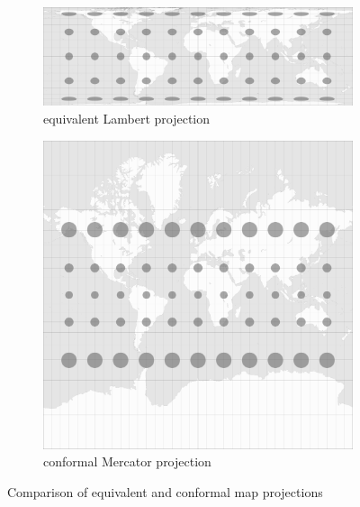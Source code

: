 \begin{figure}[ht]
  \centering
  \begin{subfigure}{0.59\textwidth}
    \centering
    \includegraphics[width=0.9\linewidth]{graphics/basics/projection_distortion_lambert.png}
    \caption{equivalent Lambert projection \protect\footnotemark}
  \end{subfigure}
  \begin{subfigure}{0.39\textwidth}
    \centering
    \includegraphics[width=0.9\linewidth]{graphics/basics/projection_distortion_mercator.png}
    \caption{conformal Mercator projection \protect\footnotemark}
  \end{subfigure}
  \caption{Comparison of equivalent and conformal map projections}
  \label{fig:lambert_vs_mercator}
\end{figure}

\addtocounter{footnote}{-1}

